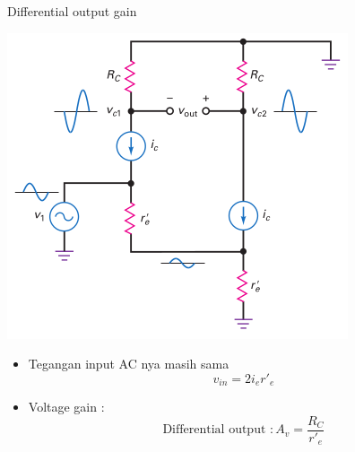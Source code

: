 \documentclass[aspectratio=169]{beamer}
\begin{document}
\begin{frame}{Differential output gain}
	\begin{multicols}{2}
		\begin{center}
			\includegraphics[height=0.7\textheight]{gambar/01.diff-amp/01.noninverting_input_and_differential_output}
		\end{center}
		\columnbreak
		\begin{itemize}
			\item Tegangan input AC nya masih sama
			\[ v_{in} = 2 i_e r'_e \]
			\item Voltage gain : 
			\begin{equation}
				\text{Differential output }: A_v = \frac{R_C}{r'_e}
			\end{equation}
		\end{itemize}
	\end{multicols}
\end{frame}
\end{document}
